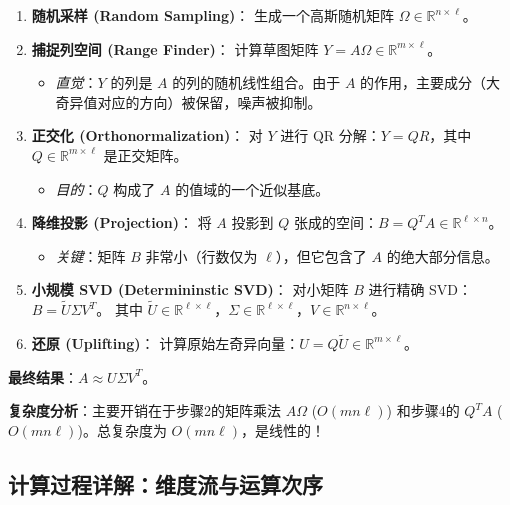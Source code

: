 \documentclass[11pt,a4paper]{ctexart}
\theoremstyle{definition}
\theoremstyle{remark}
\begin{document}
\begin{enumerate}
    \item \textbf{随机采样 (Random Sampling)}：
    生成一个高斯随机矩阵 $\Omega \in \mathbb{R}^{n \times \ell}$。
    
    \item \textbf{捕捉列空间 (Range Finder)}：
    计算草图矩阵 $Y = A \Omega \in \mathbb{R}^{m \times \ell}$。
    \begin{itemize}
        \item \textit{直觉}：$Y$ 的列是 $A$ 的列的随机线性组合。由于 $A$ 的作用，主要成分（大奇异值对应的方向）被保留，噪声被抑制。
    \end{itemize}
    
    \item \textbf{正交化 (Orthonormalization)}：
    对 $Y$ 进行 QR 分解：$Y = QR$，其中 $Q \in \mathbb{R}^{m \times \ell}$ 是正交矩阵。
    \begin{itemize}
        \item \textit{目的}：$Q$ 构成了 $A$ 的值域的一个近似基底。
    \end{itemize}
    
    \item \textbf{降维投影 (Projection)}：
    将 $A$ 投影到 $Q$ 张成的空间：$B = Q^T A \in \mathbb{R}^{\ell \times n}$。
    \begin{itemize}
        \item \textit{关键}：矩阵 $B$ 非常小（行数仅为 $\ell$），但它包含了 $A$ 的绝大部分信息。
    \end{itemize}
    
    \item \textbf{小规模 SVD (Determininstic SVD)}：
    对小矩阵 $B$ 进行精确 SVD：$B = \tilde{U} \Sigma V^T$。
    其中 $\tilde{U} \in \mathbb{R}^{\ell \times \ell}$，$\Sigma \in \mathbb{R}^{\ell \times \ell}$，$V \in \mathbb{R}^{n \times \ell}$。
    
    \item \textbf{还原 (Uplifting)}：
    计算原始左奇异向量：$U = Q \tilde{U} \in \mathbb{R}^{m \times \ell}$。
\end{enumerate}

\textbf{最终结果}：$A \approx U \Sigma V^T$。

\textbf{复杂度分析}：主要开销在于步骤2的矩阵乘法 $A\Omega$ ($O(mn\ell)$) 和步骤4的 $Q^T A$ ($O(mn\ell)$)。总复杂度为 $O(mn\ell)$，是线性的！


\subsection{计算过程详解：维度流与运算次序}
\end{document}
